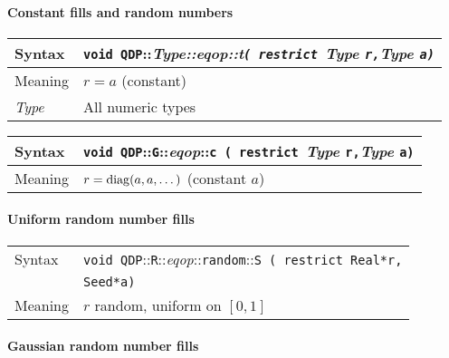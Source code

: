 \documentclass[12pt,letterpaper]{article}
\newcommand{\diag}{\mathop{\rm diag}}
\newcommand{\tReal}{Real}
\newcommand{\tRandomState}{Seed}
\newcommand{\namespace}{QDP}
\newcommand{\allNumericTypes}{All numeric types}
\newcommand{\ttdash}{{::}}
\newcommand{\itt}{\it Type}
\newcommand{\extraarg}{}
\begin{document}
\paragraph{Constant fills and random numbers}

\begin{flushleft}
  \begin{tabular}{|l|l|}
  \hline
  Syntax      & {\tt void \namespace}\ttdash\itt\ttdash{\it eqop}\ttdash{\it t}{\tt ( restrict }{\it Type }{\tt *r,}{\it Type }{\tt *a\extraarg)} \\
  \hline
  Meaning     & $r = a$ (constant)\\
  \hline
  \itt        & \allNumericTypes \\
  \hline
  \end{tabular}
\end{flushleft}

\begin{flushleft}
  \begin{tabular}{|l|l|}
  \hline
  Syntax      & {\tt void \namespace}\ttdash{\tt G}\ttdash{\it eqop}\ttdash{\tt c ( restrict }{\it Type }{\tt *r,}{\it Type }{\tt *a\extraarg)} \\
  \hline
  Meaning     & $r = \diag(a,a,\ldots{})$ (constant $a$)\\
  \hline
  \end{tabular}
\end{flushleft}

\paragraph{Uniform random number fills}

\begin{flushleft}
  \begin{tabular}{|l|l|}
  \hline
  Syntax      & {\tt void \namespace}\ttdash{\tt R}\ttdash{\it eqop}\ttdash{\tt random}\ttdash{\tt S ( restrict \tReal *r,}\\
              & {\tt \tRandomState *a\extraarg )} \\
  \hline
  Meaning     & $r$ random, uniform on $[0,1]$ \\
  \hline
  \end{tabular}
\end{flushleft}

\paragraph{Gaussian random number fills}
\end{document}

